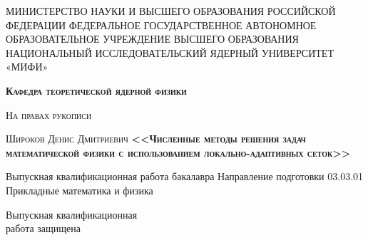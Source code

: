 \begin{titlepage}
    \newpage
    
    \begin{center}
    МИНИСТЕРСТВО НАУКИ И ВЫСШЕГО ОБРАЗОВАНИЯ РОССИЙСКОЙ ФЕДЕРАЦИИ ФЕДЕРАЛЬНОЕ ГОСУДАРСТВЕННОЕ АВТОНОМНОЕ ОБРАЗОВАТЕЛЬНОЕ УЧРЕЖДЕНИЕ ВЫСШЕГО ОБРАЗОВАНИЯ НАЦИОНАЛЬНЫЙ ИССЛЕДОВАТЕЛЬСКИЙ ЯДЕРНЫЙ УНИВЕРСИТЕТ «МИФИ» \\
    \end{center}
    
    
    \vspace{2.5em} %
    
    \begin{center}
        \textsc{\textbf{Кафедра теоретической ядерной физики\\}}
    \end{center}
    \vspace{1em}
    \begin{center}
    \textsc{На правах рукописи\\} 
    \end{center}
    \begin{center}
        \textsc{\Large Широков Денис Дмитриевич\linebreak  \linebreak  \Large \textbf{ <<Численные методы решения задач математической физики с использованием локально-адаптивных сеток>>}}
    \end{center} 
    
    \vspace{1em}
    
    \begin{center}
    Выпускная квалификационная работа бакалавра \linebreak Направление подготовки 03.03.01 Прикладные математика и физика
    \end{center}
    
    \vspace{1em}
    
   
    \newbox{\lbox}
    \newlength{\maxl}
    \setlength{\maxl}{\wd\lbox}
    \hfill\parbox{9cm}{
    \hspace*{1.5cm}\hspace*{-3cm}Выпускная квалификационная\\ \hspace*{1.5cm}\hspace*{-3cm}работа защищена\\ 
    
}
\end{titlepage}
